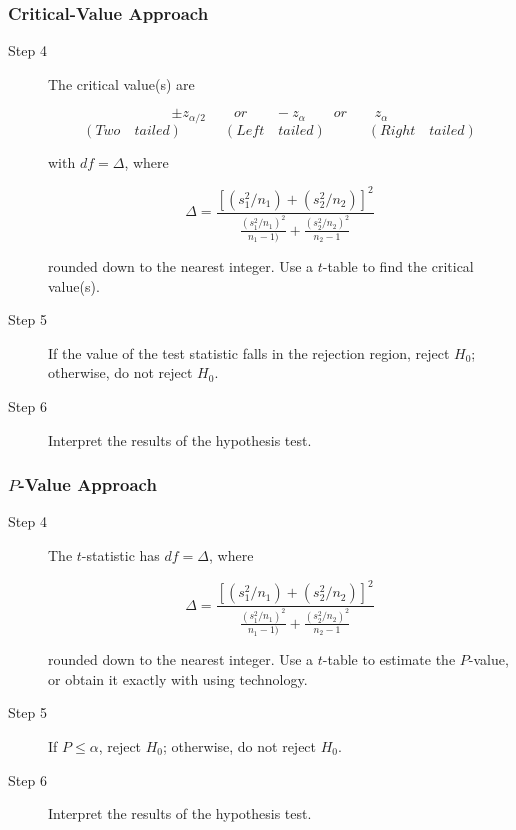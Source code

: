\documentclass[12pt]{article}
\begin{document}
            \subsubsection{Critical-Value Approach}
                \begin{description}
                    \item[Step 4] The critical value(s) are
                    \begin{center}
                        \[
                            \pm z _{\alpha/2} \quad\quad or \quad\quad -z_{\alpha} \quad\quad or
                            \quad\quad z_{\alpha}     
                        \]
                        \[
                            (Two \quad tailed)\quad\quad\quad(Left \quad tailed)\quad\quad\quad
                            (Right \quad tailed)
                        \]
                    \end{center}
                    with $df = \Delta$, where
                    \begin{center}
                        \[
                            \Delta = \frac{[(s_1^2/n_1)+(s_2^2/n_2)]^2}
                                          {\frac{(s_1^2/n_1)^2}{n_1-1)}+
                                          \frac{(s_2^2/n_2)^2}{n_2-1}}   
                        \]
                    \end{center}
                    rounded down to the nearest integer. Use a $t$-table to find the critical
                    value(s).
                    \item[Step 5] If the value of the test statistic falls in the rejection 
                    region, reject $H_0$; otherwise, do not reject $H_0$.
                    \item[Step 6] Interpret the results of the hypothesis test.            
                \end{description}
            \subsubsection{$P$-Value Approach}
                \begin{description}
                    \item[Step 4] The $t$-statistic has $df = \Delta$, where
                    \begin{center}
                        \[
                            \Delta = \frac{[(s_1^2/n_1)+(s_2^2/n_2)]^2}
                                          {\frac{(s_1^2/n_1)^2}{n_1-1)}+
                                          \frac{(s_2^2/n_2)^2}{n_2-1}}   
                        \]
                    \end{center}
                    rounded down to the nearest integer. Use a $t$-table to estimate the 
                    $P$-value, or obtain it exactly with using technology.
                    \item[Step 5] If $P \leq \alpha$, reject $H_0$; otherwise, do not reject
                    $H_0$.
                    \item[Step 6] Interpret the results of the hypothesis test. 
                \end{description}
\end{document}
